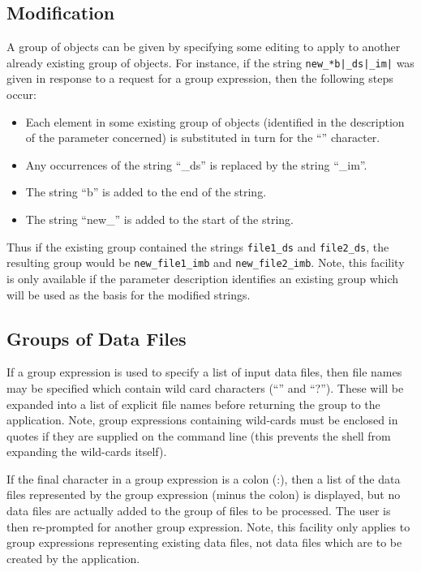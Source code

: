 \documentclass[twoside,11pt]{starlink}
\providecommand{\lsk}{\raisebox{-0.4ex}{\rm *}}
\begin{document}
\subsection{\label{SEC:MOD}Modification}
A group of objects can be given by specifying some editing to
apply to another already existing group of objects. For instance,
if the string \verb+new_*b|_ds|_im|+ was given in response to a request
for a group expression, then the following steps occur:

\begin{itemize}
\item   Each element in some existing group of objects (identified in
     the description of the parameter concerned) is substituted
     in turn for the ``\lsk'' character.
\item  Any occurrences of the string ``\_ds'' is replaced by the string
     ``\_im''.
\item  The string ``b'' is added to the end of the string.
\item  The string ``new\_'' is added to the start of the string.
\end{itemize}

Thus if the existing group contained the strings \verb+file1_ds+ and
\verb+file2_ds+, the resulting group would be \verb+new_file1_imb+
and \verb+new_file2_imb+. Note, this facility is only available if
the parameter description identifies an existing group which will be used
as the basis for the modified strings.

\subsection{Groups of Data Files}
\label{SEC:NDF}
If a group expression is used to specify a list of input data files,
then file names may be specified which contain wild card characters
(``\lsk'' and ``?''). These  will be expanded into a list of explicit
file names before returning the group to the application. Note,
group expressions containing wild-cards must be enclosed
in quotes if they are supplied on the command line (this prevents the shell
from expanding the wild-cards itself).

If the final character in a group expression is a colon (:), then a list
of the data files represented by the group expression (minus the colon)
is displayed, but no data files are actually added to the group of files
to be processed. The user is then re-prompted for another group
expression. Note, this facility only applies to group expressions
representing existing data files, not data files which are to be created
by the application.
\end{document}
